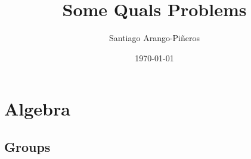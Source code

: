\documentclass[11pt]{amsart}
\theoremstyle{plain}
\theoremstyle{definition}
\theoremstyle{remark}
\begin{document}
\title{Some Quals Problems}
\author{Santiago Arango-Piñeros}
\date{\today}

\maketitle



\section{Algebra}
\subsection{Groups}
\end{document}
